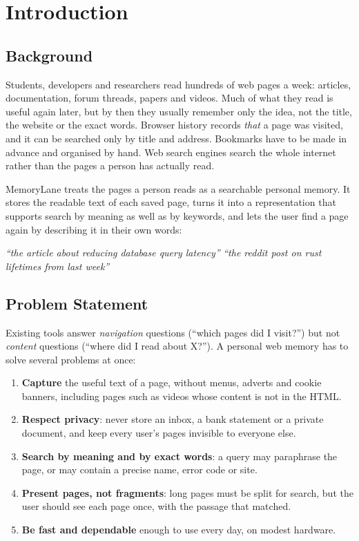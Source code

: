 
\chapter{Introduction}

\section{Background}

Students, developers and researchers read hundreds of web pages a week:
articles, documentation, forum threads, papers and videos. Much of what they
read is useful again later, but by then they usually remember only the idea,
not the title, the website or the exact words. Browser history records
\emph{that} a page was visited, and it can be searched only by title and
address. Bookmarks have to be made in advance and organised by hand. Web
search engines search the whole internet rather than the pages a person has
actually read.

MemoryLane treats the pages a person reads as a searchable personal memory.
It stores the readable text of each saved page, turns it into a
representation that supports search by meaning as well as by keywords, and
lets the user find a page again by describing it in their own words:

\begin{center}
\textit{``the article about reducing database query latency''} \quad
\textit{``the reddit post on rust lifetimes from last week''}
\end{center}

\section{Problem Statement}

Existing tools answer \emph{navigation} questions (``which pages did I
visit?'') but not \emph{content} questions (``where did I read about X?'').
A personal web memory has to solve several problems at once:

\begin{enumerate}
  \item \textbf{Capture} the useful text of a page, without menus, adverts
  and cookie banners, including pages such as videos whose content is not in
  the HTML.
  \item \textbf{Respect privacy}: never store an inbox, a bank statement or a
  private document, and keep every user's pages invisible to everyone else.
  \item \textbf{Search by meaning and by exact words}: a query may paraphrase
  the page, or may contain a precise name, error code or site.
  \item \textbf{Present pages, not fragments}: long pages must be split for
  search, but the user should see each page once, with the passage that
  matched.
  \item \textbf{Be fast and dependable} enough to use every day, on modest
  hardware.
\end{enumerate}

